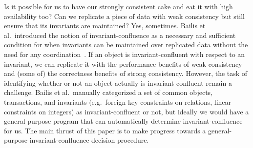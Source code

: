 Is it possible for us to have our strongly consistent cake and eat it with high
availability too? Can we replicate a piece of data with weak consistency but
still ensure that its invariants are maintained? Yes, sometimes. Bailis et al.\
introduced the notion of invariant-confluence as a necessary and sufficient
condition for when invariants can be maintained over replicated data without
the need for any coordination~\cite{bailis2014coordination}. If an object is
invariant-confluent with respect to an invariant, we can replicate it with the
performance benefits of weak consistency and (some of) the correctness benefits
of strong consistency. However, the task of identifying whether or not an
object actually is invariant-confluent remain a challenge. Bailis et al.\
manually categorized a set of common objects, transactions, and invariants
(e.g.\ foreign key constraints on relations, linear constraints on integers) as
invariant-confluent or not, but ideally we would have a general purpose program
that can automatically determine invariant-confluence for us. The main thrust
of this paper is to make progress towards a general-purpose
invariant-confluence decision procedure.



